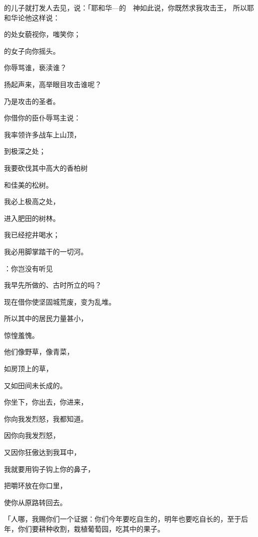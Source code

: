 {\par }{\PP {}的儿子{}就打发人去见{}，说：「耶和华—{}的　神如此说，你既然求我攻击{}王{}，
所以耶和华论他这样说：
\par }{的处女藐视你，嗤笑你；
\par }{的女子向你摇头。
\par }{\BB \par }{\Q {}你辱骂谁，亵渎谁？
\par }{\Q 扬起声来，高举眼目攻击谁呢？
\par }{\Q 乃是攻击{}的圣者。
\par }{\Q {}你借你的臣仆辱骂主说：
\par }{\Q 我率领许多战车上山顶，
\par }{\Q 到{}极深之处；
\par }{\Q 我要砍伐其中高大的香柏树
\par }{\Q 和佳美的松树。
\par }{\Q 我必上极高之处，
\par }{\Q 进入肥田的树林。
\par }{\Q {}我已经挖井喝水；
\par }{\Q 我必用脚掌踏干{}的一切河。
\par }{\BB \par }{\Q {}：你岂没有听见
\par }{\Q 我早先所做的、古时所立的吗？
\par }{\Q 现在借你使坚固城荒废，变为乱堆。
\par }{\Q {}所以其中的居民力量甚小，
\par }{\Q 惊惶羞愧。
\par }{\Q 他们像野草，像青菜，
\par }{\Q 如房顶上的草，
\par }{\Q 又如田间未长成的{}。
\par }{\BB \par }{\Q {}你坐下，你出去，你进来，
\par }{\Q 你向我发烈怒，我都知道。
\par }{\Q {}因你向我发烈怒，
\par }{\Q 又因你狂傲{}达到我耳中，
\par }{\Q 我就要用钩子钩上你的鼻子，
\par }{\Q 把嚼环放在你口里，
\par }{\Q 使你从原路转回去。
\par }{\PP {}「{}人哪，我赐你们一个证据：你们今年要吃自生的，明年也要吃自长的，至于后年，你们要耕种收割，栽植葡萄园，吃其中的果子。
}
